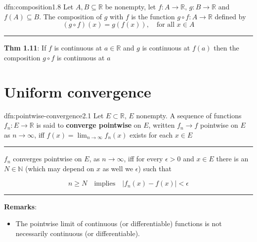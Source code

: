 \documentclass[landscape, 8pt]{extarticle}
\begin{document}
\begin{multicols}{3}

%

\vspace{-5pt}
\begin{dfn}[Composition]{dfn:composition}{1.8}
	Let $A, B \subseteq \mathbb{R}$ be nonempty, let $f : A \to \mathbb{R},\, g : B \to \mathbb{R}$ and $f(A) \subseteq B$. The composition of $g$ with $f$ is the function $g \circ f : A \to \mathbb{R}$ defined by
	\[(g \circ f)(x) = g(f(x)), \quad \text{for all $x\in A$}\]

	\vspace{-5pt}
	\noindent\rule{\textwidth}{0.2pt}

	\textbf{Thm 1.11}: If $f$ is continuous at $a\in \mathbb{R}$ and $g$ is continuous at $f(a)$ then the composition $g \circ f$ is continuous at $a$
\end{dfn}

\vspace{-15pt}
\section{Uniform convergence}

\begin{dfn}{dfn:pointwise-convergence}{2.1}
	\vspace{-5pt}
	Let $E \subset \mathbb{R}$, $E$ nonempty. A sequence of functions $f_{n}: E\to \mathbb{R}$ is said to \textbf{converge pointwise} on $E$, written $f_{n}\to f$ pointwise on $E$ as $n\to \infty$, iff $f(x) = \lim_{n \to \infty}f_{n}(x)$ exists for each $x \in E$

	\noindent\rule{\textwidth}{0.2pt}
	$f_{n}$ converges pointwise on $E$, as $n\to\infty$, iff for every $\epsilon>0$ and $x \in E$ there is an $N \in\mathbb{N}$ (which may depend on $x$ as well we $\epsilon$) such that

	\vspace{-8pt}
	\[n\ge N\quad\text{implies}\quad \lvert f_{n}(x)-f(x) \rvert < \epsilon\]

	\vspace{-5pt}
	\noindent\rule{\textwidth}{0.2pt}
	\textbf{Remarks}:
	\vspace{-5pt}
	\begin{itemize}[leftmargin=*]
		\setlength\itemsep{0em}
		\item The pointwise limit of continuous (or differentiable) functions is not necessarily continuous (or differentiable).


\end{itemize}
\end{dfn}
\end{multicols}
\end{document}
